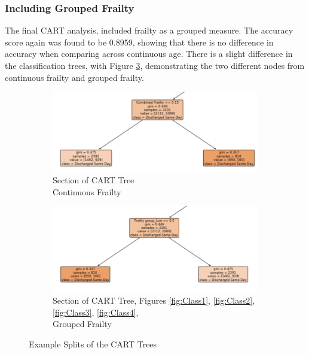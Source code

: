 \documentclass[../thesis.tex]{subfiles}
\begin{document}
\subsubsection{Including Grouped Frailty}
The final CART analysis, included frailty as a grouped measure. The accuracy score again was found to be 0.8959, showing that there is no difference in accuracy when comparing across continuous age. There is a slight difference in the classification trees, with Figure \ref{Fig:CARTSsplit}, demonstrating the two different nodes from continuous frailty and grouped frailty.
\begin{figure}[h!]
\centering
\begin{subfigure}{.49\textwidth}
  \centering
  \captionsetup{justification=centering}
  \includegraphics[width=1\linewidth]{Chapter4/Figures/Split1a.png}
  \caption{Section of CART Tree\\ Continuous Frailty}
  \label{Fig:CARTSplit1}
\end{subfigure}
\begin{subfigure}{.49\textwidth}
  \centering
  \captionsetup{justification=centering}
  \includegraphics[width=1\linewidth]{Chapter4/Figures/Split1.png}
  \caption{Section of CART Tree, Figures \ref{fig:Class1}, \ref{fig:Class2}, \ref{fig:Class3}, \ref{fig:Class4},\\ Grouped Frailty}
  \label{Fig:CARTSplit2}
\end{subfigure}
\caption{Example Splits of the CART Trees}
\label{Fig:CARTSsplit}
\end{figure}
\end{document}
